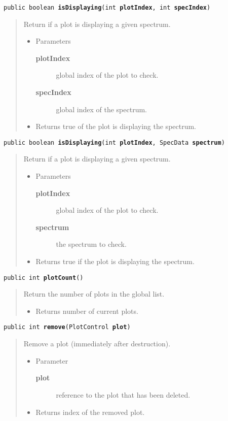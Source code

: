 \documentclass[twoside,11pt,nolof]{starlink}
\providecommand{\method}[1]{\texttt{#1}}
\newenvironment{desc}{\begin{quote}}{\end{quote}}
\begin{document}
\method{public boolean \textbf{isDisplaying}(\texttt{int} \textbf{plotIndex}, \texttt{int} \textbf{specIndex})\label{l299}\label{l300}}
\begin{desc}Return if a plot is displaying a given spectrum.
\begin{itemize}
\item{Parameters
  \begin{description}
   \item[\textbf{plotIndex}]{global index of the plot to check.}
   \item[\textbf{specIndex}]{global index of the spectrum.}
  \end{description}}
\end{itemize}
\begin{itemize}
\item{Returns true of the plot is displaying the spectrum. }
\end{itemize}
\end{desc}

\method{public boolean \textbf{isDisplaying}(\texttt{int} \textbf{plotIndex}, \texttt{SpecData} \textbf{spectrum})\label{l301}\label{l302}}
\begin{desc}Return if a plot is displaying a given spectrum.
\begin{itemize}
\item{Parameters
  \begin{description}
   \item[\textbf{plotIndex}]{global index of the plot to check.}
   \item[\textbf{spectrum}]{the spectrum to check.}
  \end{description}}
\end{itemize}
\begin{itemize}
\item{Returns true if the plot is displaying the spectrum. }
\end{itemize}
\end{desc}

\method{public int \textbf{plotCount}()\label{l303}\label{l304}}
\begin{desc}Return the number of plots in the global list.
\begin{itemize}
\item{Returns number of current plots. }
\end{itemize}
\end{desc}

\method{public int \textbf{remove}(\texttt{PlotControl} \textbf{plot})\label{l305}\label{l306}}
\begin{desc}Remove a plot (immediately after destruction).
\begin{itemize}
\item{Parameter
  \begin{description}
   \item[\textbf{plot}]{reference to the plot that has been deleted.}
  \end{description}}
\end{itemize}
\begin{itemize}
\item{Returns index of the removed plot. }
\end{itemize}
\end{desc}
\end{document}
